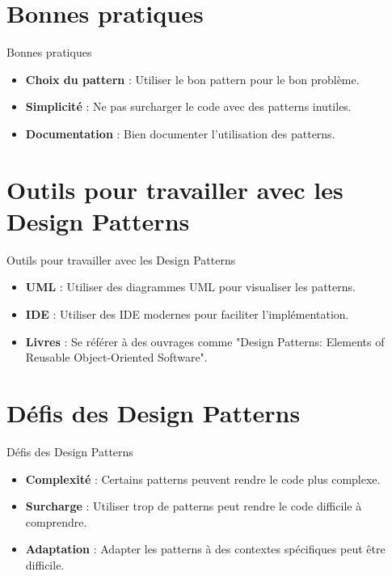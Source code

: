 \documentclass{clbeamer2024}
\begin{document}
	\section{Bonnes pratiques}
	\begin{frame}{Bonnes pratiques}
		\begin{itemize}
			\item \textbf{Choix du pattern} : Utiliser le bon pattern pour le bon problème.
			\item \textbf{Simplicité} : Ne pas surcharger le code avec des patterns inutiles.
			\item \textbf{Documentation} : Bien documenter l'utilisation des patterns.
		\end{itemize}
	\end{frame}
	
	
	\section{Outils pour travailler avec les Design Patterns}
	\begin{frame}{Outils pour travailler avec les Design Patterns}
		\begin{itemize}
			\item \textbf{UML} : Utiliser des diagrammes UML pour visualiser les patterns.
			\item \textbf{IDE} : Utiliser des IDE modernes pour faciliter l'implémentation.
			\item \textbf{Livres} : Se référer à des ouvrages comme "Design Patterns: Elements of Reusable Object-Oriented Software".
		\end{itemize}
	\end{frame}
	
	
	\section{Défis des Design Patterns}
	\begin{frame}{Défis des Design Patterns}
		\begin{itemize}
			\item \textbf{Complexité} : Certains patterns peuvent rendre le code plus complexe.
			\item \textbf{Surcharge} : Utiliser trop de patterns peut rendre le code difficile à comprendre.
			\item \textbf{Adaptation} : Adapter les patterns à des contextes spécifiques peut être difficile.
		\end{itemize}
	\end{frame}
	
\end{document}
